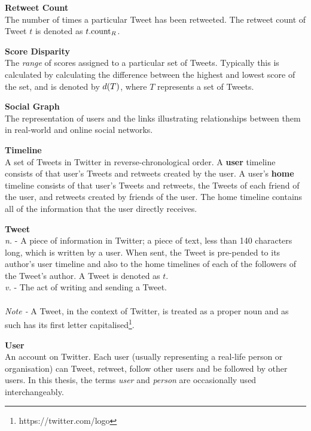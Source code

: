 {\bf Retweet Count}\\
The number of times a particular Tweet has been retweeted. The retweet count of Tweet $t$ is denoted as $t.\textrm{count}_R$.

{\bf Score Disparity}\\
The \textit{range} of scores assigned to a particular set of Tweets. Typically this is calculated by calculating the difference between the highest and lowest score of the set, and is denoted by $d(T)$, where $T$ represents a set of Tweets. 

{\bf Social Graph}\\
The representation of users and the links illustrating relationships between them in real-world and online social networks.

{\bf Timeline}\\
A set of Tweets in Twitter in reverse-chronological order. A \textbf{user} timeline consists of that user's Tweets and retweets created by the user. A user's \textbf{home} timeline consists of that user's Tweets and retweets, the Tweets of each friend of the user, and retweets created by friends of the user. The home timeline contains all of the information that the user directly receives. 

{\bf Tweet}\\
\textit{n.} - A piece of information in Twitter; a piece of text, less than 140 characters long, which is written by a user. When sent, the Tweet is pre-pended to its author's user timeline and also to the home timelines of each of the followers of the Tweet's author. A Tweet is denoted as $t$.\\
\textit{v.} - The act of writing and sending a Tweet.\\ \\
\textit{Note -} A Tweet, in the context of Twitter, is treated as a proper noun and as such has its first letter capitalised\footnote{https://twitter.com/logo}.

{\bf User}\\
An account on Twitter. Each user (usually representing a real-life person or organisation) can Tweet, retweet, follow other users and be followed by other users. In this thesis, the terms \textit{user} and \textit{person} are occasionally used interchangeably.
